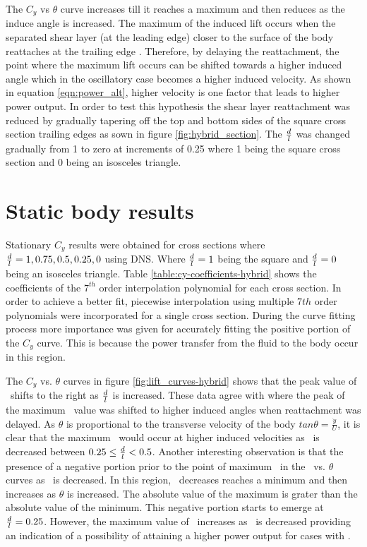 The $C_y$ vs $\theta$ curve increases till it reaches a maximum and then reduces as the induce angle is increased. The maximum of the induced lift occurs when the separated  shear layer (at the leading edge) closer to the surface of the body reattaches at the trailing edge \citep{Luo1994,Luo2003}. Therefore, by delaying the reattachment, the point where the maximum lift occurs can be shifted towards a higher induced angle which in the oscillatory case becomes a higher induced velocity. As shown in equation \ref{eqn:power_alt}, higher velocity is one factor that leads to higher power output. In order to test this hypothesis the shear layer reattachment was reduced by gradually tapering off the top and bottom sides of the square cross section trailing edges as sown in figure \ref{fig:hybrid_section}. The $\frac{d}{l}$ was changed gradually from 1 to zero at increments of 0.25 where 1 being the square cross section and 0 being an isosceles triangle.    



\section{Static body results}
 \label{sec:cross-sec-Static body results}


Stationary $C_y$ results were obtained for cross sections where $\frac{d}{l}=1,0.75,0.5,0.25,0$ using DNS. Where $\frac{d}{l}=1$ being the square and $\frac{d}{l}=0$ being an isosceles  triangle. Table \ref{table:cy-coefficients-hybrid} shows the coefficients of the $7^{th}$ order interpolation polynomial for each cross section. In order to achieve a better fit, piecewise interpolation using multiple $7th$ order polynomials were incorporated for a single cross section. During the curve fitting process more importance was given for accurately fitting  the positive portion of the $C_{y}$ curve. This is because the power transfer from the fluid to the body occur in this region. 



The $C_y$ vs. $\theta$ curves in figure \ref{fig:lift_curves-hybrid} shows that the peak value of \cy\ shifts to the right as $\frac{d}{l}$ is increased. These data agree with \citep{Luo1994} where the peak of the maximum \cy\ value was shifted to higher induced angles when reattachment was delayed. As $\theta$ is proportional to the transverse velocity of the body $tan{\theta}=\frac{\dot{y}}{U}$, it is clear that the maximum \cy\ would occur at higher induced velocities as \ratio\ is decreased between $0.25\leq\frac{d}{l}<0.5$. Another interesting observation is that the presence of a negative portion prior to the point of maximum \cy\ in the \cy\ vs. $\theta$ curves as \ratio\ is decreased. In this region, \cy\ decreases reaches a minimum and then increases as $\theta$ is increased. The absolute value of the maximum is grater than the absolute value of the minimum. This negative portion starts to emerge at $\frac{d}{l}=0.25$. However, the maximum value of \cy\ increases as \ratio\ is decreased providing an indication of a possibility of attaining a higher power output for cases with \ratio.

